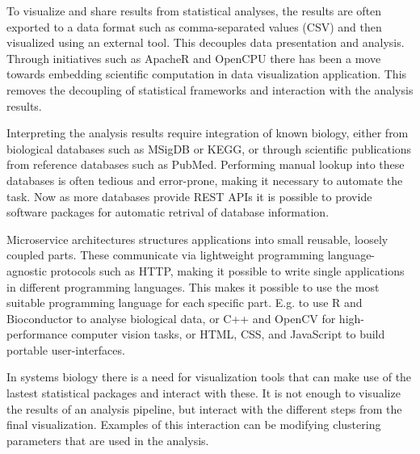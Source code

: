 To visualize and share results from statistical analyses, the results are often
exported to a data format such as comma-separated values (CSV) and
then visualized using an external tool. This decouples data presentation and
analysis.  
Through initiatives such as ApacheR and OpenCPU there has been a move
towards embedding scientific computation in data visualization application. This
removes the decoupling of statistical frameworks and interaction with the
analysis results. 

Interpreting the analysis results require integration of known biology, either
from biological databases such as MSigDB\cite{} or KEGG\cite{}, or through
scientific publications from reference databases such as PubMed\cite{}.
Performing manual lookup into these databases is often tedious and error-prone,
making it necessary to automate the task. Now as more databases provide REST
APIs it is possible to provide software packages for automatic retrival of
database information. 




Microservice architectures structures applications into small reusable, loosely
coupled parts. These communicate via lightweight programming language-agnostic
protocols such as HTTP, making it possible to write single applications in
different programming languages. This makes it possible to use the most suitable
programming language for each specific part. E.g. to use R and Bioconductor to
analyse biological data, or C++ and OpenCV for high-performance computer vision
tasks, or HTML, CSS, and JavaScript to build portable user-interfaces. 


In systems biology there is a need for visualization tools that can make use of
the lastest statistical packages and interact with these. It is not enough to
visualize the results of an analysis pipeline, but interact with the different
steps from the final visualization. Examples of this interaction can be
modifying clustering parameters that are used in the analysis.

